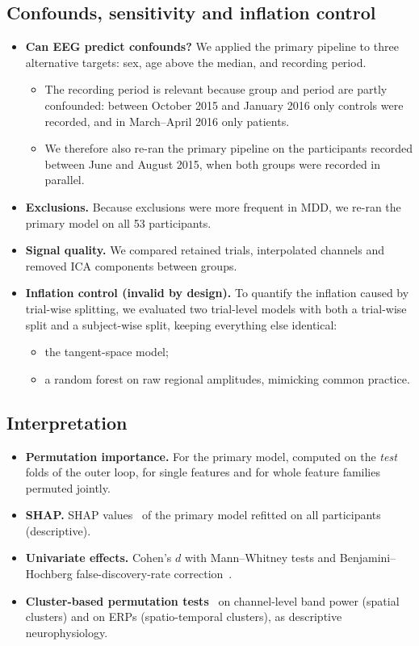 \subsection{Confounds, sensitivity and inflation control}
\begin{itemize}
  \item \textbf{Can EEG predict confounds?} We applied the primary pipeline to three alternative targets: sex,
        age above the median, and recording period.
        \begin{itemize}
          \item The recording period is relevant because group and period are partly confounded: between October 2015
                and January 2016 only controls were recorded, and in March--April 2016 only patients.
          \item We therefore also re-ran the primary pipeline on the participants recorded between June and
                August 2015, when both groups were recorded in parallel.
        \end{itemize}
  \item \textbf{Exclusions.} Because exclusions were more frequent in MDD, we re-ran the primary model on all 53
        participants.
  \item \textbf{Signal quality.} We compared retained trials, interpolated channels and removed ICA components
        between groups.
  \item \textbf{Inflation control (invalid by design).} To quantify the inflation caused by trial-wise splitting,
        we evaluated two trial-level models with both a trial-wise split and a subject-wise split, keeping
        everything else identical:
        \begin{itemize}
          \item the tangent-space model;
          \item a random forest on raw regional amplitudes, mimicking common practice.
        \end{itemize}
\end{itemize}

\subsection{Interpretation}
\begin{itemize}
  \item \textbf{Permutation importance.} For the primary model, computed on the \emph{test} folds of the outer loop,
        for single features and for whole feature families permuted jointly.
  \item \textbf{SHAP.} SHAP values~\cite{lundberg2017shap} of the primary model refitted on all participants
        (descriptive).
  \item \textbf{Univariate effects.} Cohen's $d$ with Mann--Whitney tests and Benjamini--Hochberg false-discovery-rate
        correction~\cite{benjamini1995fdr}.
  \item \textbf{Cluster-based permutation tests}~\cite{maris2007nonparametric} on channel-level band power
        (spatial clusters) and on ERPs (spatio-temporal clusters), as descriptive neurophysiology.
\end{itemize}

